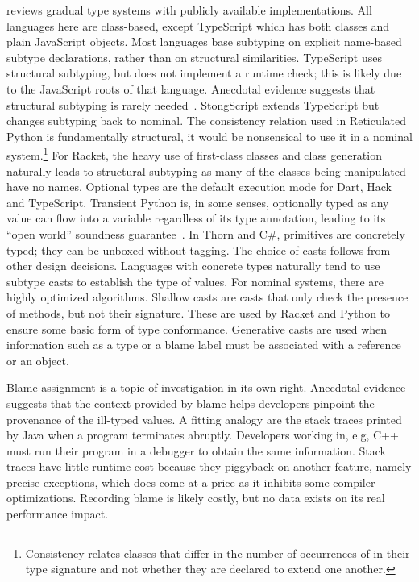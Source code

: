 \documentclass[acmsmall, anonymous, authordraft, review]{acmart} %
\begin{document}
 reviews gradual type systems with publicly available
implementations. All languages here are class-based, except TypeScript which
has both classes and plain JavaScript objects. Most languages base subtyping
on explicit name-based subtype declarations, rather than on structural
similarities.  TypeScript uses structural subtyping, but does not implement
a runtime check; this is likely due to the JavaScript roots of that
language.  Anecdotal evidence suggests that structural subtyping is rarely
needed~\cite{ecoop15}. StongScript extends TypeScript but changes subtyping
back to nominal.  The consistency relation used in Reticulated Python is
fundamentally structural, it would be nonsensical to use it in a nominal
system.\footnote{Consistency relates classes that differ in the number of
  occurrences of \any in their type signature and not whether they are
  declared to extend one another.}  For Racket, the heavy use of first-class
classes and class generation naturally leads to structural subtyping as many
of the classes being manipulated have no names.  Optional types are the
default execution mode for Dart, Hack and TypeScript.  Transient Python is,
in some senses, optionally typed as any value can flow into a variable
regardless of its type annotation, leading to its ``open world'' soundness
guarantee~\cite{siek14}.  In Thorn and C\#, primitives are concretely typed;
they can be unboxed without tagging.  The choice of casts follows from other
design decisions. Languages with concrete types naturally tend to use
subtype casts to establish the type of values. For nominal systems, there are
highly optimized algorithms. Shallow casts are casts that only check the
presence of methods, but not their signature. These are used by Racket and
Python to ensure some basic form of type conformance. Generative casts are
used when information such as a type or a blame label must be associated
with a reference or an object.

Blame assignment is a topic of investigation in its own right. Anecdotal
evidence suggests that the context provided by blame helps developers
pinpoint the provenance of the ill-typed values. A fitting analogy are the
stack traces printed by Java when a program terminates abruptly. Developers
working in, e.g, C++ must run their program in a debugger to obtain the same
information. Stack traces have little runtime cost because they piggyback
on another feature, namely precise exceptions, which does come at a price as
it inhibits some compiler optimizations. Recording blame is likely costly, 
but no data exists on its real performance impact.
\end{document}

